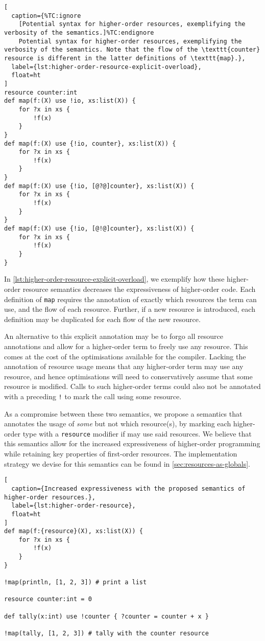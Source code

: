 \begin{lstlisting}[
  caption={%TC:ignore
    [Potential syntax for higher-order resources, exemplifying the verbosity of the semantics.]%TC:endignore
    Potential syntax for higher-order resources, exemplifying the verbosity of the semantics. Note that the flow of the \texttt{counter} resource is different in the latter definitions of \texttt{map}.},
  label={lst:higher-order-resource-explicit-overload},
  float=ht
]
resource counter:int
def map(f:(X) use !io, xs:list(X)) {
    for ?x in xs {
        !f(x)
    }
}
def map(f:(X) use {!io, counter}, xs:list(X)) {
    for ?x in xs {
        !f(x)
    }
}
def map(f:(X) use {!io, [@?@]counter}, xs:list(X)) {
    for ?x in xs {
        !f(x)
    }
}
def map(f:(X) use {!io, [@!@]counter}, xs:list(X)) {
    for ?x in xs {
        !f(x)
    }
}
\end{lstlisting}

In \cref{lst:higher-order-resource-explicit-overload}, we exemplify how these higher-order resource semantics decreases the expressiveness of higher-order code. Each definition of \texttt{map} requires the annotation of exactly which resources the term can use, and the flow of each resource. Further, if a new resource is introduced, each definition may be duplicated for each flow of the new resource.

An alternative to this explicit annotation may be to forgo all resource annotations and allow for a higher-order term to freely use any resource. This comes at the cost of the optimisations available for the compiler. Lacking the annotation of resource usage means that any higher-order term may use any resource, and hence optimisations will need to conservatively assume that some resource is modified. Calls to such higher-order terms could also not be annotated with a preceding \texttt{!} to mark the call using some resource.

As a compromise between these two semantics, we propose a semantics that annotates the usage of \textit{some} but not which resource(s), by marking each higher-order type with a \texttt{resource} modifier if may use said resources. We believe that this semantics allow for the increased expressiveness of higher-order programming while retaining key properties of first-order resources. The implementation strategy we devise for this semantics can be found in \cref{sec:resources-as-globals}. 

\begin{lstlisting}[
  caption={Increased expressiveness with the proposed semantics of higher-order resources.},
  label={lst:higher-order-resource},
  float=ht
]
def map(f:{resource}(X), xs:list(X)) {
    for ?x in xs {
        !f(x)
    }
}

!map(println, [1, 2, 3]) # print a list

resource counter:int = 0

def tally(x:int) use !counter { ?counter = counter + x }

!map(tally, [1, 2, 3]) # tally with the counter resource
\end{lstlisting}


